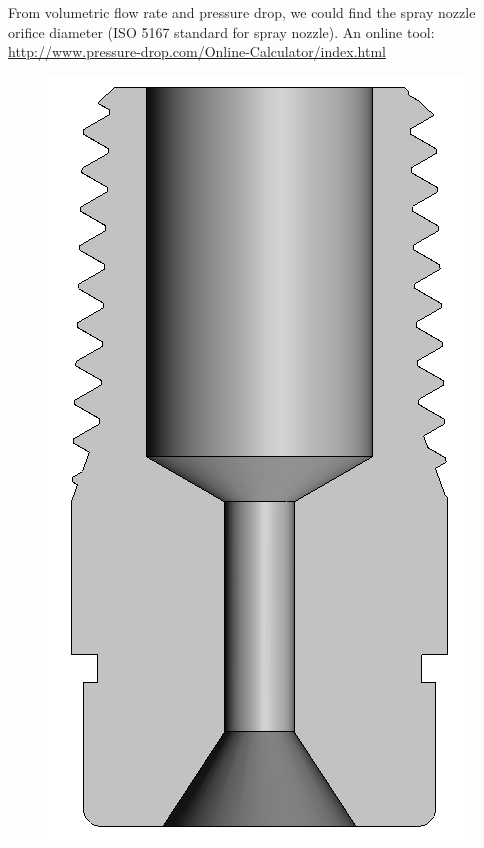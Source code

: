 \documentclass{beamer}
\begin{document}
\begin{frame}
    \noindent
    \begin{minipage}[t]{0.65\textwidth}
        From volumetric flow rate and pressure drop, we could find the spray nozzle orifice diameter (ISO 5167 standard for spray nozzle). An online tool: \url{http://www.pressure-drop.com/Online-Calculator/index.html}
    \end{minipage}%
    \hfill
    \begin{minipage}[t]{0.35\textwidth}
        \vspace{-5pt}
        \begin{figure}[t]
            \centering \includegraphics[height=0.3\textheight]{images/spray_nozzle.png}
        \end{figure}
    \end{minipage}
\end{frame}
\end{document}
